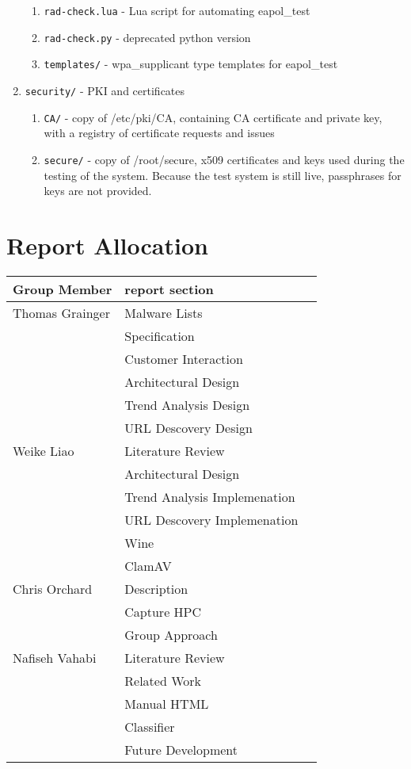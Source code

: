 \begin{enumerate}
\begin{enumerate}
 \item\texttt{rad-check.lua} - Lua script for automating eapol\_test
 \item\texttt{rad-check.py} - deprecated python version
 \item\texttt{templates/} - wpa\_supplicant type templates for eapol\_test
\end{enumerate}
\item\texttt{security/} - PKI and certificates
\begin{enumerate}
 \item\texttt{CA/} - copy of /etc/pki/CA, containing CA certificate and private key,
                with a registry of certificate requests and issues 
 \item\texttt{secure/} - copy of /root/secure, x509 certificates and keys used during
                the testing of the system. Because the test system is still
                live, passphrases for keys are not provided.
\end{enumerate}
\end{enumerate}

\clearpage
\section{Report Allocation}
\label{sec:words}
\begin{center}
\begin{tabularx}{\linewidth}{|XXX|}
\hline
Group Member & report section\\ \hline
Thomas Grainger & Malware Lists\\
& Specification\\
& Customer Interaction\\
& Architectural Design\\
& Trend Analysis Design\\
& URL Descovery Design\\ \hline

Weike Liao & Literature Review \\
& Architectural Design \\
& Trend Analysis Implemenation \\
& URL Descovery Implemenation \\
& Wine \\
& ClamAV \\ \hline

Chris Orchard & Description \\
& Capture HPC \\
& Group Approach \\ \hline

Nafiseh Vahabi & Literature Review  \\
& Related Work \\
& Manual HTML \\
& Classifier \\
& Future Development \\ \hline
\hline
\end{tabularx}
\end{center}